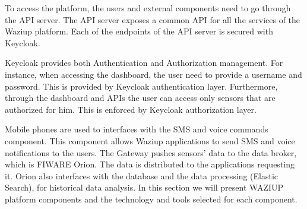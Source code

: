 To access the platform, the users and external components need to go through the API server.
The API server exposes a common API for all the services of the Waziup platform.
Each of the endpoints of the API server is secured with Keycloak.

Keycloak provides both Authentication and Authorization management.
For instance, when accessing the dashboard, the user need to provide a username and password.
This is provided by Keycloak authentication layer.
Furthermore, through the dashboard and APIs the user can access only sensors that are authorized for him.
This is enforced by Keycloak authorization layer.

Mobile phones are used to interfaces with the SMS and voice commands component.
This component allows Waziup applications to send SMS and voice notifications to the users.
The Gateway pushes sensors' data to the data broker, which is FIWARE Orion.
The data is distributed to the applications requesting it.
Orion also interfaces with the database and the data processing (Elastic Search), for historical data analysis.
In this section we will present WAZIUP platform components and the technology and tools selected for each component.


